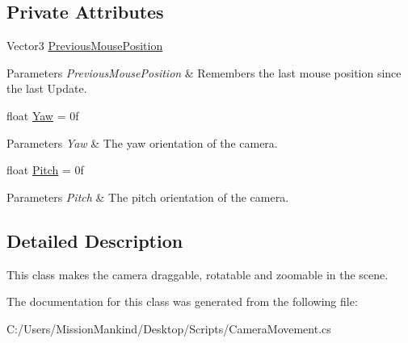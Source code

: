 \subsection*{Private Attributes}
\begin{DoxyCompactItemize}
\item 
\mbox{\label{class_camera_movement_a68e2584501a6aaca0f1f4612d919da83}} 
Vector3 \hyperlink{class_camera_movement_a68e2584501a6aaca0f1f4612d919da83}{Previous\+Mouse\+Position}
\begin{DoxyCompactList}\small\item\em 
\begin{DoxyParams}{Parameters}
{\em Previous\+Mouse\+Position} & Remembers the last mouse position since the last Update.\\
\hline
\end{DoxyParams}
\end{DoxyCompactList}\item 
\mbox{\label{class_camera_movement_ae0a5e90a6fa1d305f2412d88e2bf2e35}} 
float \hyperlink{class_camera_movement_ae0a5e90a6fa1d305f2412d88e2bf2e35}{Yaw} = 0f
\begin{DoxyCompactList}\small\item\em 
\begin{DoxyParams}{Parameters}
{\em Yaw} & The yaw orientation of the camera.\\
\hline
\end{DoxyParams}
\end{DoxyCompactList}\item 
\mbox{\label{class_camera_movement_adbf4bd21e962dbba99fdf24c85fc2665}} 
float \hyperlink{class_camera_movement_adbf4bd21e962dbba99fdf24c85fc2665}{Pitch} = 0f
\begin{DoxyCompactList}\small\item\em 
\begin{DoxyParams}{Parameters}
{\em Pitch} & The pitch orientation of the camera.\\
\hline
\end{DoxyParams}
\end{DoxyCompactList}\end{DoxyCompactItemize}


\subsection{Detailed Description}
This class makes the camera draggable, rotatable and zoomable in the scene. 



The documentation for this class was generated from the following file\+:\begin{DoxyCompactItemize}
\item 
C\+:/\+Users/\+Mission\+Mankind/\+Desktop/\+Scripts/Camera\+Movement.\+cs\end{DoxyCompactItemize}
